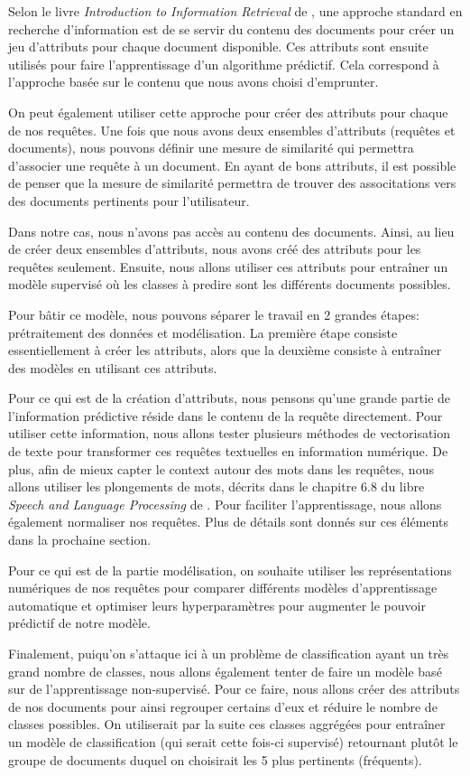 
Selon le livre \emph{Introduction to Information Retrieval} de \cite{schutze2008introduction}, une approche standard en recherche d'information est de se servir du contenu des documents pour créer un jeu d'attributs pour chaque document disponible. Ces attributs sont ensuite utilisés pour faire l'apprentissage d'un algorithme prédictif. Cela correspond à l'approche basée sur le contenu que nous avons choisi d'emprunter.

On peut également utiliser cette approche pour créer des attributs pour chaque de nos requêtes. Une fois que nous avons deux ensembles d'attributs (requêtes et documents), nous pouvons définir une mesure de similarité qui permettra d'associer une requête à un document. En ayant de bons attributs, il est possible de penser que la mesure de similarité permettra de trouver des associtations vers des documents pertinents pour l'utilisateur.

Dans notre cas, nous n'avons pas accès au contenu des documents. Ainsi, au lieu de créer deux ensembles d'attributs, nous avons créé des attributs pour les requêtes seulement. Ensuite, nous allons utiliser ces attributs pour entraîner un modèle supervisé où les classes à predire sont les différents documents possibles.
\break

Pour bâtir ce modèle, nous pouvons séparer le travail en 2 grandes étapes: prétraitement des données et modélisation. La première étape consiste essentiellement à créer les attributs, alors que la deuxième consiste à entraîner des modèles en utilisant ces attributs.

Pour ce qui est de la création d'attributs, nous pensons qu'une grande partie de l'information prédictive réside dans le contenu de la requête directement. Pour utiliser cette information, nous allons tester plusieurs méthodes de vectorisation de texte pour transformer ces requêtes textuelles en information numérique. De plus, afin de mieux capter le context autour des mots dans les requêtes, nous allons utiliser les plongements de mots, décrits dans le chapitre 6.8 du libre \emph{Speech and Language Processing} de \cite{jurafsky2014speech}. Pour faciliter l'apprentissage, nous allons également normaliser nos requêtes. Plus de détails sont donnés sur ces éléments dans la prochaine section.

Pour ce qui est de la partie modélisation, on souhaite utiliser les représentations numériques de nos requêtes pour comparer différents modèles d'apprentissage automatique et optimiser leurs hyperparamètres pour augmenter le pouvoir prédictif de notre modèle.
\break

Finalement, puiqu'on s'attaque ici à un problème de classification ayant un très grand nombre de classes, nous allons également tenter de faire un modèle basé sur de l'apprentissage non-supervisé. Pour ce faire, nous allons créer des attributs de nos documents pour ainsi regrouper certains d'eux et réduire le nombre de classes possibles. On utiliserait par la suite ces classes aggrégées pour entraîner un modèle de classification (qui serait cette fois-ci supervisé) retournant plutôt le groupe de documents duquel on choisirait les 5 plus pertinents (fréquents).

